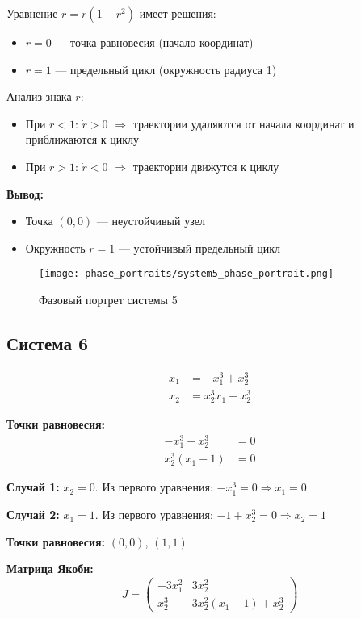 Уравнение $\dot{r} = r(1 - r^2)$ имеет решения:
\begin{itemize}
\item $r = 0$ --- точка равновесия (начало координат)
\item $r = 1$ --- предельный цикл (окружность радиуса 1)
\end{itemize}

Анализ знака $\dot{r}$:
\begin{itemize}
\item При $r < 1$: $\dot{r} > 0$ $\Rightarrow$ траектории удаляются от начала координат и приближаются к циклу
\item При $r > 1$: $\dot{r} < 0$ $\Rightarrow$ траектории движутся к циклу
\end{itemize}

\textbf{Вывод:}
\begin{itemize}
\item Точка $(0,0)$ --- неустойчивый узел
\item Окружность $r = 1$ --- устойчивый предельный цикл
\end{itemize}

\begin{figure}[H]
\centering
\texttt{[image: phase\_portraits/system5\_phase\_portrait.png]}
\caption{Фазовый портрет системы 5}
\label{fig:system5_phase_portrait}
\end{figure}

\subsection*{Система 6}

\begin{align}
\dot{x}_1 &= -x_1^3 + x_2^3 \\
\dot{x}_2 &= x_2^3 x_1 - x_2^3
\end{align}

\textbf{Точки равновесия:}
\begin{align}
-x_1^3 + x_2^3 &= 0 \\
x_2^3(x_1 - 1) &= 0
\end{align}

\textbf{Случай 1:} $x_2 = 0$. Из первого уравнения: $-x_1^3 = 0 \Rightarrow x_1 = 0$

\textbf{Случай 2:} $x_1 = 1$. Из первого уравнения: $-1 + x_2^3 = 0 \Rightarrow x_2 = 1$

\textbf{Точки равновесия:} $(0, 0)$, $(1, 1)$

\textbf{Матрица Якоби:}
$$J = \begin{pmatrix} -3x_1^2 & 3x_2^2 \\ x_2^3 & 3x_2^2(x_1 - 1) + x_2^3 \end{pmatrix}$$

